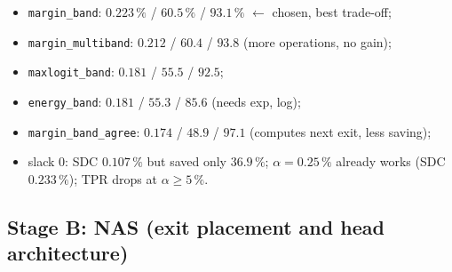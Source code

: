 \documentclass[10pt,a4paper]{article}
\newcommand{\meth}[1]{\texttt{#1}}
\newcommand{\ours}{\meth{margin\_band}}
\begin{document}
\begin{itemize}
  \begin{itemize}
    \item \ours: $0.223\,\%$ / $\mathbf{60.5\,\%}$ / $93.1\,\%$ $\leftarrow$ chosen, best trade-off;
    \item \meth{margin\_multiband}: $0.212$ / $60.4$ / $93.8$ (more operations, no gain);
    \item \meth{maxlogit\_band}: $0.181$ / $55.5$ / $92.5$;
    \item \meth{energy\_band}: $0.181$ / $55.3$ / $85.6$ (needs exp, log);
    \item \meth{margin\_band\_agree}: $0.174$ / $48.9$ / $97.1$ (computes next exit, less saving);
    \item slack 0: SDC $0.107\,\%$ but saved only $36.9\,\%$; $\alpha=0.25\,\%$ already works (SDC $0.233\,\%$);
          TPR drops at $\alpha\ge5\,\%$.
  \end{itemize}
\end{itemize}

\subsection{Stage B: NAS (exit placement and head architecture)}
\end{document}
